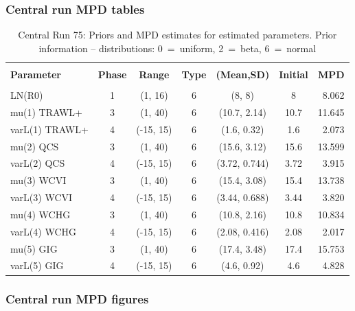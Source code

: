 \subsubsection{Central run MPD tables}


\setlength{\tabcolsep}{4pt}
\begin{table}[!h]
\centering
\caption{Central Run 75: Priors and MPD estimates for estimated parameters. Prior information -- distributions: 0~=~uniform, 2~=~beta, 6~=~normal}
\label{tab:ymr.parest}
\usefont{\encodingdefault}{\familydefault}{\seriesdefault}{\shapedefault}\small
\begin{tabular}{lcccccr}
\hline \\ [-1.5ex]
{\bf Parameter} & {\bf Phase} & {\bf Range} & {\bf Type} & {\bf (Mean,SD)} & {\bf Initial} & {\bf MPD} \\ [1ex]
\hline \\ [-1.5ex]
LN(R0) & 1 & (1, 16) & 6 & (8, 8) & 8 & 8.062 \\
mu(1) TRAWL+ & 3 & (1, 40) & 6 & (10.7, 2.14) & 10.7 & 11.645 \\
varL(1) TRAWL+ & 4 & (-15, 15) & 6 & (1.6, 0.32) & 1.6 & 2.073 \\
mu(2) QCS & 3 & (1, 40) & 6 & (15.6, 3.12) & 15.6 & 13.599 \\
varL(2) QCS & 4 & (-15, 15) & 6 & (3.72, 0.744) & 3.72 & 3.915 \\
mu(3) WCVI & 3 & (1, 40) & 6 & (15.4, 3.08) & 15.4 & 13.738 \\
varL(3) WCVI & 4 & (-15, 15) & 6 & (3.44, 0.688) & 3.44 & 3.820 \\
mu(4) WCHG & 3 & (1, 40) & 6 & (10.8, 2.16) & 10.8 & 10.834 \\
varL(4) WCHG & 4 & (-15, 15) & 6 & (2.08, 0.416) & 2.08 & 2.017 \\
mu(5) GIG & 3 & (1, 40) & 6 & (17.4, 3.48) & 17.4 & 15.753 \\
varL(5) GIG & 4 & (-15, 15) & 6 & (4.6, 0.92) & 4.6 & 4.828 \\
\hline
\end{tabular}
\usefont{\encodingdefault}{\familydefault}{\seriesdefault}{\shapedefault}\normalsize
\end{table}

\newpage
\subsubsection{Central run MPD figures}


